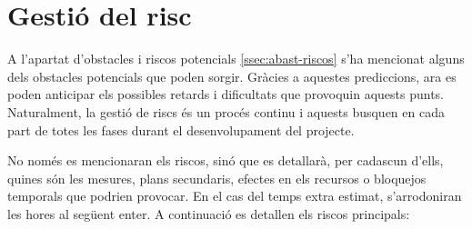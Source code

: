 \section{Gestió del risc} \label{sec:gestio_risc}
A l'apartat d'obstacles i riscos potencials \ref{ssec:abast-riscos} s'ha mencionat alguns dels obstacles potencials que poden sorgir. Gràcies a aquestes prediccions, ara es poden anticipar els possibles retards i dificultats que provoquin aquests punts. Naturalment, la gestió de riscs és un procés continu i aquests busquen en cada part de totes les fases durant el desenvolupament del projecte.

No només es mencionaran els riscos, sinó que es detallarà, per cadascun d'ells, quines són les mesures, plans secundaris, efectes en els recursos o bloquejos temporals que podrien provocar. En el cas del temps extra estimat, s'arrodoniran les hores al següent enter. A continuació es detallen els riscos principals:


